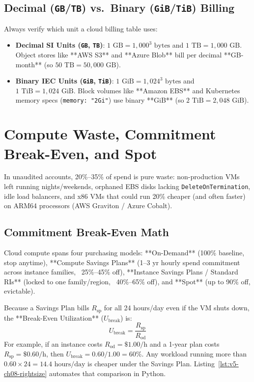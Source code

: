 \subsection{Decimal (\texttt{GB}/\texttt{TB}) vs.\ Binary (\texttt{GiB}/\texttt{TiB}) Billing}

Always verify which unit a cloud billing table uses:
\begin{itemize}[leftmargin=18pt]
  \item \textbf{Decimal SI Units (\texttt{GB}, \texttt{TB})}: $1\text{ GB} = 1,000^3\text{ bytes}$ and $1\text{ TB} = 1,000\text{ GB}$. Object stores like **AWS S3** and **Azure Blob** bill per decimal **GB-month** (so $50\text{ TB} = 50,000\text{ GB}$).
  \item \textbf{Binary IEC Units (\texttt{GiB}, \texttt{TiB})}: $1\text{ GiB} = 1,024^3\text{ bytes}$ and $1\text{ TiB} = 1,024\text{ GiB}$. Block volumes like **Amazon EBS** and Kubernetes memory specs (\texttt{memory: "2Gi"}) use binary **GiB** (so $2\text{ TiB} = 2,048\text{ GiB}$).
\end{itemize}

\section{Compute Waste, Commitment Break-Even, and Spot}

In unaudited accounts, 20\%--35\% of spend is pure waste: non-production VMs left running nights/weekends, orphaned EBS disks lacking \texttt{DeleteOnTermination}, idle load balancers, and x86 VMs that could run 20\% cheaper (and often faster) on ARM64 processors (AWS Graviton / Azure Cobalt).

\subsection{Commitment Break-Even Math}

Cloud compute spans four purchasing models: **On-Demand** (100\% baseline, stop anytime), **Compute Savings Plans** (1--3 yr hourly spend commitment across instance families, ~25\%--45\% off), **Instance Savings Plans / Standard RIs** (locked to one family/region, ~40\%--65\% off), and **Spot** (up to 90\% off, evictable).

Because a Savings Plan bills $R_{\text{sp}}$ for all 24 hours/day even if the VM shuts down, the **Break-Even Utilization** ($U_{\text{break}}$) is:
\begin{equation}
U_{\text{break}} = \frac{R_{\text{sp}}}{R_{\text{od}}}
\end{equation}
For example, if an instance costs $R_{\text{od}} = \$1.00/\text{h}$ and a 1-year plan costs $R_{\text{sp}} = \$0.60/\text{h}$, then $U_{\text{break}} = 0.60 / 1.00 = 60\%$. Any workload running more than $0.60 \times 24 = 14.4\text{ hours/day}$ is cheaper under the Savings Plan. Listing~\ref{lst:v5-ch08-rightsize} automates that comparison in Python.

